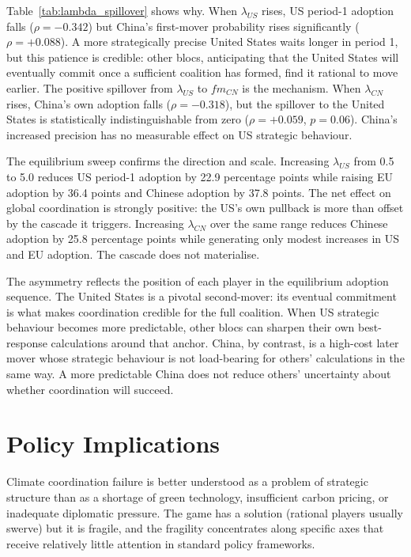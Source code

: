 \documentclass[10pt,a4paper]{article}
\begin{document}
\FloatBarrier

\FloatBarrier

Table~\ref{tab:lambda_spillover} shows why. When $\lambda_{US}$ rises, US period-1 adoption
falls ($\rho = -0.342$) but China's first-mover probability rises significantly ($\rho =
+0.088$). A more strategically precise United States waits longer in period 1, but this
patience is credible: other blocs, anticipating that the United States will eventually
commit once a sufficient coalition has formed, find it rational to move earlier. The positive
spillover from $\lambda_{US}$ to $fm_{CN}$ is the mechanism. When $\lambda_{CN}$ rises,
China's own adoption falls ($\rho = -0.318$), but the spillover to the United States is
statistically indistinguishable from zero ($\rho = +0.059$, $p = 0.06$). China's increased
precision has no measurable effect on US strategic behaviour.

The equilibrium sweep confirms the direction and scale. Increasing $\lambda_{US}$ from 0.5
to 5.0 reduces US period-1 adoption by 22.9 percentage points while raising EU adoption by
36.4 points and Chinese adoption by 37.8 points. The net effect on global coordination is
strongly positive: the US's own pullback is more than offset by the cascade it triggers.
Increasing $\lambda_{CN}$ over the same range reduces Chinese adoption by 25.8 percentage
points while generating only modest increases in US and EU adoption. The cascade does not
materialise.

The asymmetry reflects the position of each player in the equilibrium adoption sequence. The
United States is a pivotal second-mover: its eventual commitment is what makes coordination
credible for the full coalition. When US strategic behaviour becomes more predictable, other
blocs can sharpen their own best-response calculations around that anchor. China, by contrast,
is a high-cost later mover whose strategic behaviour is not load-bearing for others'
calculations in the same way. A more predictable China does not reduce others' uncertainty
about whether coordination will succeed.

\clearpage
\needspace{12em}
\section{Policy Implications}

Climate coordination failure is better understood as a problem of strategic structure than as a shortage of green technology, insufficient carbon pricing, or inadequate diplomatic pressure. The game has a solution (rational players usually swerve) but it is fragile, and the fragility concentrates along specific axes that receive relatively little attention in standard policy frameworks.
\end{document}
